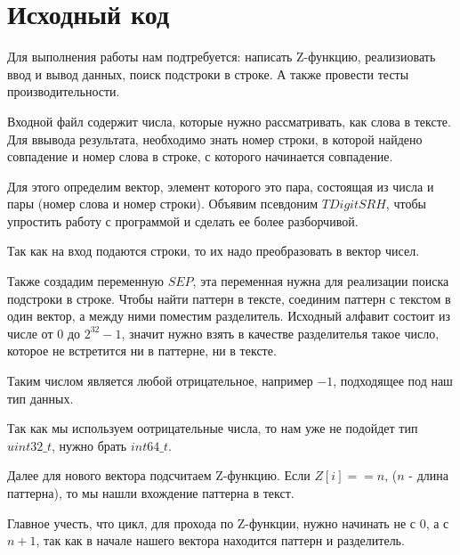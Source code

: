 \pagebreak

\section{Исходный код}

Для выполнения работы нам подтребуется: написать Z-функцию, реализиовать ввод и вывод данных, поиск подстроки в строке.
А также провести тесты производительности.


Входной файл содержит числа, которые нужно рассматривать, как слова в тексте. Для ввывода результата,
необходимо знать номер строки, в которой найдено совпадение и номер слова в строке, с которого начинается совпадение.

Для этого определим вектор, элемент которого это пара, состоящая из числа и пары (номер слова и номер строки).
Объявим псевдоним $TDigitSRH$, чтобы упростить работу с программой и сделать ее более разборчивой.


Так как на вход подаются строки, то их надо преобразовать в вектор чисел.


Также создадим переменную $SEP$, эта переменная нужна для реализации поиска подстроки в строке.
Чтобы найти паттерн в тексте, соединим паттерн с текстом в один вектор, а между ними поместим разделитель.
Исходный алфавит состоит из числе от $0$ до $2^{32} - 1$, значит нужно взять в качестве разделителья такое число,
которое не встретится ни в паттерне, ни в тексте.

Таким числом является любой отрицательное, например $-1$, подходящее под наш тип данных. 

Так как мы используем оотрицательные числа,
то нам уже не подойдет тип $uint32\_t$, нужно брать $int64\_t$.


Далее для нового вектора подсчитаем Z-функцию. Если $Z[i] == n$, ($n$ - длина паттерна), то мы нашли вхождение
паттерна в текст. 

Главное учесть, что цикл, для прохода по Z-функции, нужно начинать не с $0$, а с $n + 1$, 
так как в начале нашего вектора находится паттерн и разделитель.




